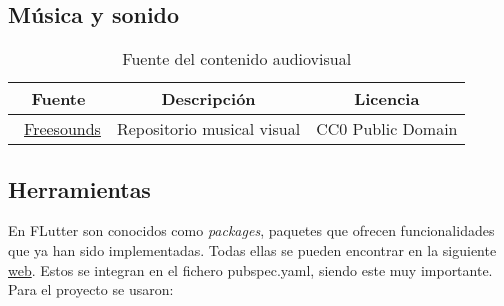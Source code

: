 \subsection{Música y sonido}

\begin{table}[H]
	\begin{center}
		\begin{tabular}{ccc}
			\hline
			Fuente                        & Descripción & Licencia  	\\ \hline
			~\href{https://www.zapsplat.com/}{Freesounds}				    & Repositorio musical visual  & CC0 Public Domain   		\\\hline
			
		\end{tabular}
		\caption{Fuente del contenido audiovisual}
		\label{table:fuentesonido}
	\end{center}
\end{table}

\subsection{Herramientas}
En FLutter son conocidos como \emph{packages}, paquetes que ofrecen funcionalidades que ya han sido implementadas. Todas ellas se pueden encontrar en la siguiente \href{https://pub.dev/}{web}. Estos se integran en el fichero pubspec.yaml, siendo este muy importante. Para el proyecto se usaron: 


